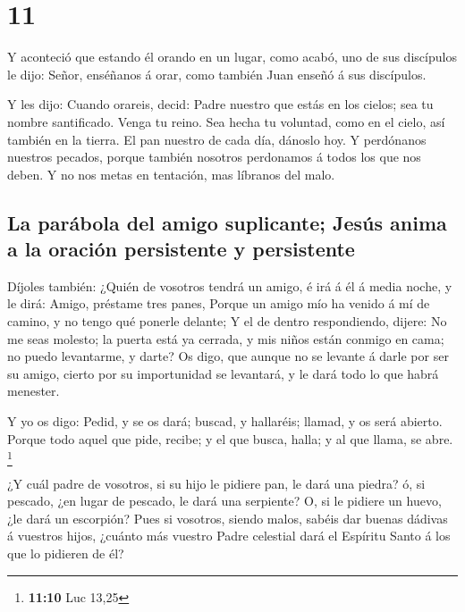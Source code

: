 \hypertarget{section-10}{%
\section{11}\label{section-10}}

 Y aconteció que estando él orando en un lugar, como
acabó, uno de sus discípulos le dijo: Señor, enséñanos á orar, como
también Juan enseñó á sus discípulos.

 Y les dijo: Cuando orareis, decid: Padre nuestro que
estás en los cielos; sea tu nombre santificado. Venga tu reino. Sea
hecha tu voluntad, como en el cielo, así también en la tierra.
 El pan nuestro de cada día, dánoslo hoy.  Y
perdónanos nuestros pecados, porque también nosotros perdonamos á todos
los que nos deben. Y no nos metas en tentación, mas líbranos del malo.

\hypertarget{la-paruxe1bola-del-amigo-suplicante-jesuxfas-anima-a-la-oraciuxf3n-persistente-y-persistente}{%
\subsection{La parábola del amigo suplicante; Jesús anima a la oración
persistente y
persistente}\label{la-paruxe1bola-del-amigo-suplicante-jesuxfas-anima-a-la-oraciuxf3n-persistente-y-persistente}}

 Díjoles también: ¿Quién de vosotros tendrá un amigo, é
irá á él á media noche, y le dirá: Amigo, préstame tres panes,
 Porque un amigo mío ha venido á mí de camino, y no tengo
qué ponerle delante;  Y el de dentro respondiendo, dijere:
No me seas molesto; la puerta está ya cerrada, y mis niños están conmigo
en cama; no puedo levantarme, y darte?  Os digo, que
aunque no se levante á darle por ser su amigo, cierto por su
importunidad se levantará, y le dará todo lo que habrá menester.

 Y yo os digo: Pedid, y se os dará; buscad, y hallaréis;
llamad, y os será abierto.  Porque todo aquel que pide,
recibe; y el que busca, halla; y al que llama, se abre. \footnote{\textbf{11:10}
  Luc 13,25}

 ¿Y cuál padre de vosotros, si su hijo le pidiere pan, le
dará una piedra? ó, si pescado, ¿en lugar de pescado, le dará una
serpiente?  O, si le pidiere un huevo, ¿le dará un
escorpión?  Pues si vosotros, siendo malos, sabéis dar
buenas dádivas á vuestros hijos, ¿cuánto más vuestro Padre celestial
dará el Espíritu Santo á los que lo pidieren de él?

